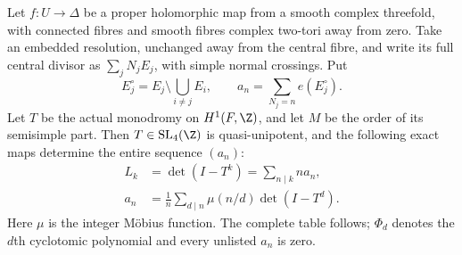 
\begin{proposition}\label{cdp:st:C.2.UN.11}
Let $f:U\to\Delta$ be a proper holomorphic map from a
smooth complex threefold, with connected fibres and
smooth fibres complex two-tori away from zero. Take
an embedded resolution, unchanged away from the
central fibre, and write its full central divisor as
$\sum_jN_jE_j$, with simple normal crossings. Put
\[
 E_j^\circ=E_j\setminus\bigcup_{i\ne j}E_i,
 \qquad a_n=\sum_{N_j=n}e(E_j^\circ).
 \tag{C.MS.1}\label{cdp:eq:C.MS.1}
\]
Let $T$ be the actual monodromy on $H^1(F,\Z)$,
and let $M$ be the order of its semisimple part.
Then $T\in\operatorname{SL}_4(\Z)$ is
quasi-unipotent, and the following exact maps
determine the entire sequence $(a_n)$:
\[
 \begin{aligned}
 L_k&=\det(I-T^k)
       =\sum_{n\mid k}n a_n,\\
 a_n&=\frac1n\sum_{d\mid n}\mu(n/d)\det(I-T^d).
 \end{aligned}                                  \tag{C.MS.2}\label{cdp:eq:C.MS.2}
\]
Here $\mu$ is the integer M\"obius function.
The complete table follows; $\Phi_d$ denotes
the $d$th cyclotomic polynomial and every
unlisted $a_n$ is zero.


\end{proposition}
